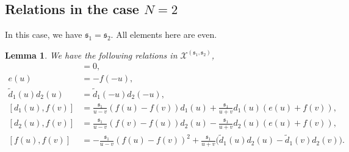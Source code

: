 \documentclass[11pt,reqno]{amsart}
\numberwithin{equation}{section}
\newtheorem{lem}[thm]{Lemma}
\theoremstyle{definition}
\theoremstyle{remark}
\newcommand{\tl}{\tilde}
\newcommand{\ka}{{\mathfrak s}}
\newcommand{\scrX}{{\mathscr{X}}}
\begin{document}
\subsection{Relations in the case $N=2$}
In this case, we have $\ka_1=\ka_2$. All elements here are even.
\begin{lem}\label{b2ser}
We have the following relations in $\scrX^{(\ka_1,\ka_2)}$,
\begin{align}
[d_i(u),d_j(v)]&=0,\label{b2dd}\\
e(u)&=-f(-u),\label{b2e=f}\\
\tl d_1(u)d_2(u)&=\tl d_1(-u)d_2(-u),\label{b2d=d}\\
[d_1(u),f(v)]&=\frac{\ka_1}{u-v}(f(u)-f(v))d_1(u)+\frac{\ka_1}{u+v}d_1(u)(e(u)+f(v)),\label{b2d1f}\\
[d_2(u),f(v)]&=\frac{\ka_1}{u-v}(f(v)-f(u))d_2(u)-\frac{\ka_1}{u+v}d_2(u)(e(u)+f(v)),\label{b2d2f}\\
[f(u),f(v)]&=-\frac{\ka_1}{u-v}(f(u)-f(v))^2+\frac{\ka_1}{u+v}\big(\tl d_1(u)d_2(u)-\tl d_1(v)d_2(v)\big).\label{b2ff}
\end{align}
\end{lem}
\end{document}
